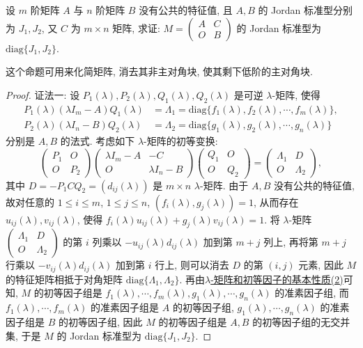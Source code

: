 \documentclass[../../main.tex]{subfiles}
\begin{document}
\begin{proposition}\label{proposition:分块上三角阵的Jordan标准型}
设 $m$ 阶矩阵 $A$ 与 $n$ 阶矩阵 $B$ 没有公共的特征值, 且 $A,B$ 的 Jordan 标准型分别为 $J_1,J_2$, 又 $C$ 为 $m \times n$ 矩阵, 求证: $M = \begin{pmatrix}A & C \\ O & B\end{pmatrix}$ 的 Jordan 标准型为 $\mathrm{diag}\{J_1,J_2\}$.
\end{proposition}
\begin{remark}
这个命题可用来化简矩阵, 消去其非主对角块, 使其剩下低阶的主对角块. 
\end{remark}
\begin{proof}
{\color{blue}证法一:}
设 $P_1(\lambda),P_2(\lambda),Q_1(\lambda),Q_2(\lambda)$ 是可逆 $\lambda$-矩阵, 使得
\begin{align*}
P_1(\lambda)(\lambda I_m - A)Q_1(\lambda) &= \Lambda_1 = \mathrm{diag}\{f_1(\lambda),f_2(\lambda),\cdots,f_m(\lambda)\},\\
P_2(\lambda)(\lambda I_n - B)Q_2(\lambda) &= \Lambda_2 = \mathrm{diag}\{g_1(\lambda),g_2(\lambda),\cdots,g_n(\lambda)\}
\end{align*}
分别是 $A,B$ 的法式. 考虑如下 $\lambda$-矩阵的初等变换:
\[
\begin{pmatrix}P_1 & O \\ O & P_2\end{pmatrix}
\begin{pmatrix}\lambda I_m - A & -C \\ O & \lambda I_n - B\end{pmatrix}
\begin{pmatrix}Q_1 & O \\ O & Q_2\end{pmatrix}
=
\begin{pmatrix}\Lambda_1 & D \\ O & \Lambda_2\end{pmatrix},
\]
其中 $D = -P_1CQ_2 = (d_{ij}(\lambda))$ 是 $m \times n$ $\lambda$-矩阵. 由于 $A,B$ 没有公共的特征值, 故对任意的 $1 \leq i \leq m$, $1 \leq j \leq n$, $(f_i(\lambda),g_j(\lambda)) = 1$, 从而存在 $u_{ij}(\lambda),v_{ij}(\lambda)$, 使得 $f_i(\lambda)u_{ij}(\lambda) + g_j(\lambda)v_{ij}(\lambda) = 1$. 将 $\lambda$-矩阵 $\begin{pmatrix}\Lambda_1 & D \\ O & \Lambda_2\end{pmatrix}$ 的第 $i$ 列乘以 $-u_{ij}(\lambda)d_{ij}(\lambda)$ 加到第 $m + j$ 列上, 再将第 $m + j$ 行乘以 $-v_{ij}(\lambda)d_{ij}(\lambda)$ 加到第 $i$ 行上, 则可以消去 $D$ 的第 $(i,j)$ 元素, 因此 $M$ 的特征矩阵相抵于对角矩阵 $\mathrm{diag}\{\Lambda_1,\Lambda_2\}$. 再由\hyperref[theorem:lambda-矩阵和初等因子的基本性质]{$\lambda$-矩阵和初等因子的基本性质(2)}可知, $M$ 的初等因子组是 $f_1(\lambda),\cdots,f_m(\lambda),g_1(\lambda),\cdots,g_n(\lambda)$ 的准素因子组, 而 $f_1(\lambda),\cdots,f_m(\lambda)$ 的准素因子组是 $A$ 的初等因子组, $g_1(\lambda),\cdots,g_n(\lambda)$ 的准素因子组是 $B$ 的初等因子组, 因此 $M$ 的初等因子组是 $A,B$ 的初等因子组的无交并集, 于是 $M$ 的 Jordan 标准型为 $\mathrm{diag}\{J_1,J_2\}$.


\end{proof}
\end{document}
